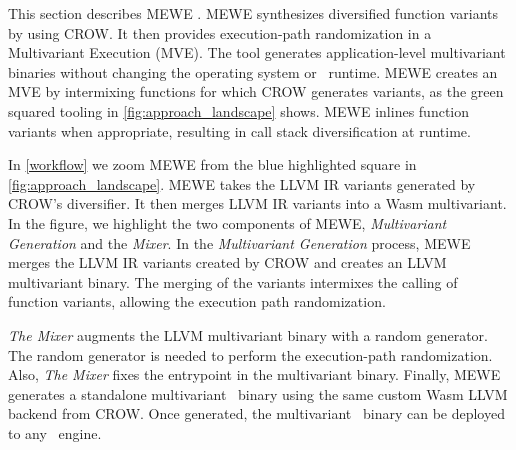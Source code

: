 
\label{section:mewe}

\renewcommand{\tool}{MEWE\xspace}
This section describes MEWE \cite{MEWE}. 
\tool synthesizes diversified function variants by using CROW.
It then provides execution-path randomization in a Multivariant Execution (MVE).
The tool generates application-level multivariant binaries without changing the operating system or \wasm\ runtime.
MEWE creates an MVE by intermixing functions for which CROW generates variants, as the green squared tooling in \autoref{fig:approach_landscape} shows.
\tool inlines function variants when appropriate, resulting in call stack diversification at runtime.

In \autoref{workflow} we zoom MEWE from the blue highlighted square in \autoref{fig:approach_landscape}. 
MEWE takes the LLVM IR variants generated by CROW's diversifier. 
It then merges LLVM IR variants into a Wasm multivariant.
In the figure, we highlight the two components of MEWE, \emph{Multivariant Generation} and the \emph{Mixer}.
In the \emph{Multivariant Generation} process, 
MEWE merges the LLVM IR variants created by CROW and creates an LLVM multivariant binary.
The merging of the variants intermixes the calling of function variants, allowing the execution path randomization.

\emph{The Mixer} augments the LLVM multivariant binary with a random generator. 
The random generator is needed to perform the execution-path randomization.
Also, \emph{The Mixer} fixes the entrypoint in the multivariant binary.
Finally, MEWE generates a standalone multivariant \wasm\ binary using the same custom Wasm LLVM backend from CROW.
Once generated, the multivariant \wasm\ binary can be deployed to any \wasm\ engine. 

